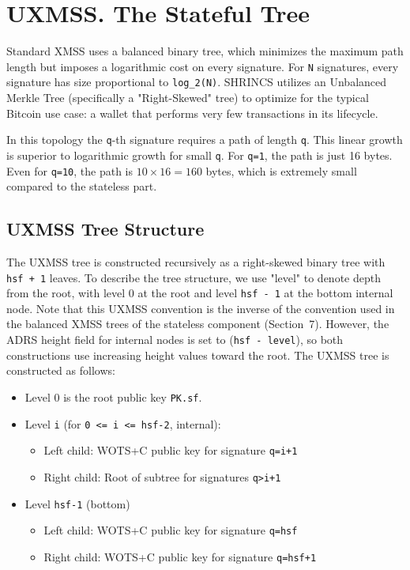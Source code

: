\section{UXMSS. The Stateful Tree}
Standard XMSS uses a balanced binary tree, which minimizes the maximum path length but imposes a logarithmic cost on every signature. For \texttt{N} signatures, every signature has size proportional to \texttt{log\_2(N)}. SHRINCS utilizes an Unbalanced Merkle Tree (specifically a "Right-Skewed" tree) to optimize for the typical Bitcoin use case: a wallet that performs very few transactions in its lifecycle.

In this topology the \texttt{q}-th signature requires a path of length \texttt{q}. This linear growth is superior to logarithmic growth for small \texttt{q}. For \texttt{q=1}, the path is just 16 bytes. Even for \texttt{q=10}, the path is $10 \times 16 = 160$ bytes, which is extremely small compared to the stateless part.
\subsection{UXMSS Tree Structure}
The UXMSS tree is constructed recursively as a right-skewed binary tree with \texttt{hsf + 1} leaves. To describe the tree structure, we use "level" to denote depth from the root, with level 0 at the root and level \texttt{hsf - 1} at the bottom internal node. Note that this UXMSS convention is the inverse of the convention used in the balanced XMSS trees of the stateless component (Section~7). However, the ADRS height field for internal nodes is set to (\texttt{hsf - level}), so both constructions use increasing height values toward the root.
The UXMSS tree is constructed as follows:
\begin{itemize}
    \item Level 0 is the root public key \texttt{PK.sf}.
    \item Level \texttt{i} (for \texttt{0 <= i <= hsf-2}, internal):
    \begin{itemize}
        \item  Left child: WOTS+C public key for signature \texttt{q=i+1}
        \item  Right child: Root of subtree for signatures \texttt{q>i+1}
    \end{itemize}
    \item Level \texttt{hsf-1} (bottom)
    \begin{itemize}
        \item Left child: WOTS+C public key for signature \texttt{q=hsf}
        \item Right child: WOTS+C public key for signature \texttt{q=hsf+1}
    \end{itemize}
\end{itemize}

